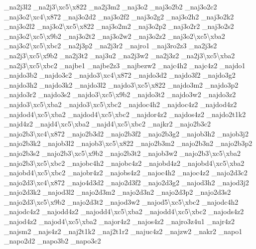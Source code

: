 \begin{DoxyCompactItemize}
\-\_\-na2j3l2 \-\_\-na2j3\textbackslash{}xc5\textbackslash{}x822 \-\_\-na2j3m2 \-\_\-naj3o2 \-\_\-naj3o2b2 \-\_\-naj3o2c2 \-\_\-naj3o2\textbackslash{}xc4\textbackslash{}x872 \-\_\-naj3o2d2 \-\_\-naj3o2f2 \-\_\-naj3o2g2 \-\_\-naj3o2h2 \-\_\-naj3o2k2 \-\_\-naj3o2l2 \-\_\-naj3o2\textbackslash{}xc5\textbackslash{}x822 \-\_\-naj3o2m2 \-\_\-naj3o2p2 \-\_\-naj3o2r2 \-\_\-naj3o2s2 \-\_\-naj3o2\textbackslash{}xc5\textbackslash{}x9b2 \-\_\-naj3o2t2 \-\_\-naj3o2w2 \-\_\-naj3o2z2 \-\_\-naj3o2\textbackslash{}xc5\textbackslash{}xba2 \-\_\-naj3o2\textbackslash{}xc5\textbackslash{}xbc2 \-\_\-na2j3p2 \-\_\-na2j3r2 \-\_\-najro1 \-\_\-naj3ro2z3 \-\_\-na2j3s2 \-\_\-na2j3\textbackslash{}xc5\textbackslash{}x9b2 \-\_\-na2j3t2 \-\_\-naj3u2 \-\_\-na2j3w2 \-\_\-na2j3z2 \-\_\-na2j3\textbackslash{}xc5\textbackslash{}xba2 \-\_\-na2j3\textbackslash{}xc5\textbackslash{}xbc2 \-\_\-najbe1 \-\_\-najbe2z3 \-\_\-najbezw2 \-\_\-najc4h2 \-\_\-najc4z2 \-\_\-najdo1 \-\_\-najdo3b2 \-\_\-najdo3c2 \-\_\-najdo3\textbackslash{}xc4\textbackslash{}x872 \-\_\-najdo3d2 \-\_\-najdo3f2 \-\_\-najdo3g2 \-\_\-najdo3h2 \-\_\-najdo3k2 \-\_\-najdo3l2 \-\_\-najdo3\textbackslash{}xc5\textbackslash{}x822 \-\_\-najdo3m2 \-\_\-najdo3p2 \-\_\-najdo3r2 \-\_\-najdo3s2 \-\_\-najdo3\textbackslash{}xc5\textbackslash{}x9b2 \-\_\-najdo3t2 \-\_\-najdo3w2 \-\_\-najdo3z2 \-\_\-najdo3\textbackslash{}xc5\textbackslash{}xba2 \-\_\-najdo3\textbackslash{}xc5\textbackslash{}xbc2 \-\_\-najdoc4h2 \-\_\-najdoc4z2 \-\_\-najdod4z2 \-\_\-najdod4\textbackslash{}xc5\textbackslash{}xba2 \-\_\-najdod4\textbackslash{}xc5\textbackslash{}xbc2 \-\_\-najdor4z2 \-\_\-najdos4z2 \-\_\-najdo2t1k2 \-\_\-najd4z2 \-\_\-najd4\textbackslash{}xc5\textbackslash{}xba2 \-\_\-najd4\textbackslash{}xc5\textbackslash{}xbc2 \-\_\-najkr2 \-\_\-najo2b3c2 \-\_\-najo2b3\textbackslash{}xc4\textbackslash{}x872 \-\_\-najo2b3d2 \-\_\-najo2b3f2 \-\_\-najo2b3g2 \-\_\-najob3h2 \-\_\-najob3j2 \-\_\-najo2b3k2 \-\_\-najob3l2 \-\_\-najob3\textbackslash{}xc5\textbackslash{}x822 \-\_\-najo2b3m2 \-\_\-najo2b3n2 \-\_\-najo2b3p2 \-\_\-najo2b3s2 \-\_\-najo2b3\textbackslash{}xc5\textbackslash{}x9b2 \-\_\-najo2b3t2 \-\_\-najob3w2 \-\_\-najo2b3\textbackslash{}xc5\textbackslash{}xba2 \-\_\-najo2b3\textbackslash{}xc5\textbackslash{}xbc2 \-\_\-najobc4h2 \-\_\-najobc4z2 \-\_\-najobd4z2 \-\_\-najobd4\textbackslash{}xc5\textbackslash{}xba2 \-\_\-najobd4\textbackslash{}xc5\textbackslash{}xbc2 \-\_\-najobr4z2 \-\_\-najobs4z2 \-\_\-najoc4h2 \-\_\-najoc4z2 \-\_\-najo2d3c2 \-\_\-najo2d3\textbackslash{}xc4\textbackslash{}x872 \-\_\-najo4d3d2 \-\_\-najo2d3f2 \-\_\-najo2d3g2 \-\_\-najod3h2 \-\_\-najod3j2 \-\_\-najo2d3k2 \-\_\-najod3l2 \-\_\-najo2d3m2 \-\_\-najo2d3n2 \-\_\-najo2d3p2 \-\_\-najo2d3s2 \-\_\-najo2d3\textbackslash{}xc5\textbackslash{}x9b2 \-\_\-najo2d3t2 \-\_\-najod3w2 \-\_\-najod5\textbackslash{}xc5\textbackslash{}xbc2 \-\_\-najodc4h2 \-\_\-najodc4z2 \-\_\-najodd4z2 \-\_\-najodd4\textbackslash{}xc5\textbackslash{}xba2 \-\_\-najodd4\textbackslash{}xc5\textbackslash{}xbc2 \-\_\-najods4z2 \-\_\-najod4z2 \-\_\-najod4\textbackslash{}xc5\textbackslash{}xba2 \-\_\-najor4z2 \-\_\-najos4z2 \-\_\-najro3z4u1 \-\_\-najr4z2 \-\_\-najsm2 \-\_\-najs4z2 \-\_\-naj2t1k2 \-\_\-naj2t1r2 \-\_\-najuc4z2 \-\_\-najzw2 \-\_\-nakr2 \-\_\-napo1 \-\_\-napo2d2 \-\_\-napo3b2 \-\_\-napo3c2 
\end{DoxyCompactItemize}
